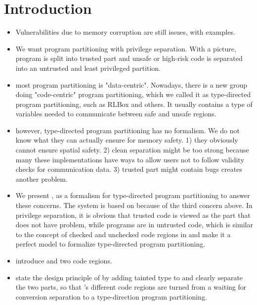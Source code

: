 \section{Introduction}\label{sec:intros}

\begin{itemize}

\item Vulnerabilities due to memory corruption are still issues, with examples.

\item We want program partitioning with privilege separation. With a picture, program is split into trusted part and unsafe or high-risk code is separated into an untrusted and least privileged partition.

\item most program partitioning is "data-centric". Nowadays, there is a new group doing "code-centric" program partitioning, which we called it as type-directed program partitioning, such as RLBox and others. It usually contains a type of variables needed to communicate between safe and unsafe regions.

\item however, type-directed program partitioning has no formalism. We do not know what they can actually ensure for memory safety. 1) they obviously cannot ensure spatial safety. 2) clean separation might be too strong because many these implementations have ways to allow users not to follow validity checks for communication data. 3) trusted part might contain bugs creates another problem.

\item We present \systemname, as a formalism for type-directed program partitioning to answer these concerns. The system is based on \checkedc because of the third concern above. In privilege separation, it is obvious that trusted code is viewed as the part that does not have problem, while programs are in untrusted code, which is similar to the concept of checked and unchecked code regions in \checkedc and make it a perfect model to formalize type-directed program partitioning.

\item introduce \checkedc and two code regions.

\item state the design principle of \systemname by adding tainted type to \checkedc and clearly separate the two parts, so that \checkedc's different code regions are turned from a waiting for conversion separation to a type-direction program partitioning. 


\end{itemize}
